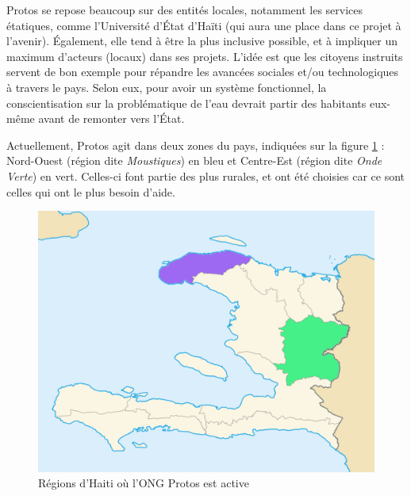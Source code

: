 \documentclass{EPL-master-thesis-covers-FR}
\begin{document}
				Protos se repose beaucoup sur des entités locales, notamment les services étatiques, comme l'Université d'\'Etat d'Haïti (qui aura une place dans ce projet à l'avenir). \'Egalement, elle tend à être la plus inclusive possible, et à impliquer un maximum d'acteurs (locaux) dans ses projets. L'idée est que les citoyens instruits servent de bon exemple pour répandre les avancées sociales et/ou technologiques à travers le pays. Selon eux, pour avoir un système fonctionnel, la conscientisation sur la problématique de l'eau devrait partir des habitants eux-même avant de remonter vers l'\'Etat.


				Actuellement, Protos agit dans deux zones du pays, indiquées sur la figure \ref{fig:carte_haiti_color} : Nord-Ouest (région dite \emph{Moustiques}) en bleu et Centre-Est (région dite \emph{Onde Verte}) en vert. Celles-ci font partie des plus rurales, et ont été choisies car ce sont celles qui ont le plus besoin d'aide.

				\begin{figure}[H]
					\includegraphics[width=\textwidth]{images/carte_regions_haiti_color}
					\caption{Régions d'Haiti où l'ONG Protos est active}
					\label{fig:carte_haiti_color}
				\end{figure}
\end{document}

